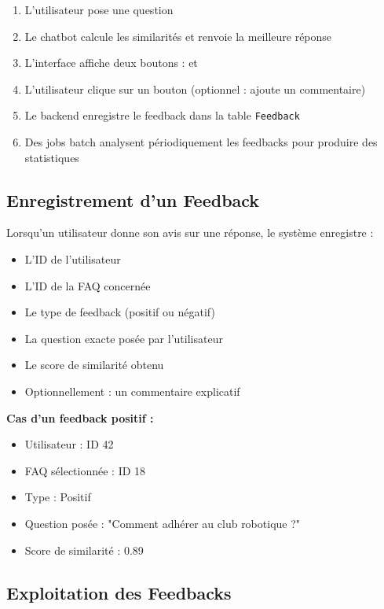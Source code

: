 \documentclass[11pt,a4paper]{article}
\begin{document}
\begin{enumerate}
    \item L'utilisateur pose une question
    \item Le chatbot calcule les similarités et renvoie la meilleure réponse
    \item L'interface affiche deux boutons : \faThumbsUp{} et \faThumbsDown{}
    \item L'utilisateur clique sur un bouton (optionnel : ajoute un commentaire)
    \item Le backend enregistre le feedback dans la table \texttt{Feedback}
    \item Des jobs batch analysent périodiquement les feedbacks pour produire des statistiques
\end{enumerate}

\subsection{Enregistrement d'un Feedback}

Lorsqu'un utilisateur donne son avis sur une réponse, le système enregistre :
\begin{itemize}
    \item L'ID de l'utilisateur
    \item L'ID de la FAQ concernée
    \item Le type de feedback (positif ou négatif)
    \item La question exacte posée par l'utilisateur
    \item Le score de similarité obtenu
    \item Optionnellement : un commentaire explicatif
\end{itemize}

\begin{exemple}
\textbf{Cas d'un feedback positif :}
\begin{itemize}
    \item Utilisateur : ID 42
    \item FAQ sélectionnée : ID 18
    \item Type : Positif
    \item Question posée : "Comment adhérer au club robotique ?"
    \item Score de similarité : 0.89
\end{itemize}
\end{exemple}

\subsection{Exploitation des Feedbacks}
\end{document}
